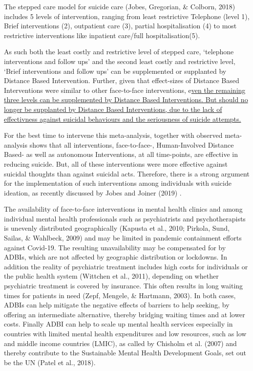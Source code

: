 \documentclass[
  english,
  man]{apa6}
\begin{document}
The stepped care model for suicide care (Jobes, Gregorian, \& Colborn, 2018) includes 5 levels of intervention, ranging from least restrictive Telephone (level 1), Brief interventions (2), outpatient care (3), partial hospitalisation (4) to most restrictive interventions like inpatient care/full hospitalisation(5).

As such both the least costly and restrictive level of stepped care, `telephone interventions and follow ups' and the second least costly and restrictive level, `Brief interventions and follow ups' can be supplemented or supplanted by Distance Based Intervention. Further, given that effect-sizes of Distance Based Interventions were similar to other face-to-face interventions, e\underline{ven the remaining three levels can be supplemented by Distance Based Interventions. But should no longer be supplanted by Distance Based Interventions, due to the lack of effectivness against suicidal behaviours and the seriousness of suicide attempts.}

For the best time to intervene this meta-analysis, together with observed meta-analysis shows that all interventions, face-to-face-, Human-Involved Distance Based- as well as autonomous Interventions, at all time-points, are effective in reducing suicide. But, all of these interventions were more effective against suicidal thoughts than against suicidal acts. Therefore, there is a strong argument for the implementation of such interventions among individuals with suicide ideation, as recently discussed by Jobes and Joiner (2019) .

The availability of face-to-face interventions in mental health clinics and among individual mental health professionals such as psychiatrists and psychotherapists is unevenly distributed geographically (Kapusta et al., 2010; Pirkola, Sund, Sailas, \& Wahlbeck, 2009) and may be limited in pandemic containment efforts against Covid-19. The resulting unavailability may be compensated for by ADBIs, which are not affected by geographic distribution or lockdowns. In addition the reality of psychiatric treatment includes high costs for individuals or the public health system (Wittchen et al., 2011), depending on whether psychiatric treatment is covered by insurance. This often results in long waiting times for patients in need (Zepf, Mengele, \& Hartmann, 2003). In both cases, ADBIs can help mitigate the negative effects of barriers to help seeking, by offering an intermediate alternative, thereby bridging waiting times and at lower costs. Finally ADBI can help to scale up mental health services especially in countries with limited mental health expenditures and low resources, such as low and middle income countries (LMIC), as called by Chisholm et al. (2007) and thereby contribute to the Sustainable Mental Health Development Goals, set out be the UN (Patel et al., 2018).
\end{document}

